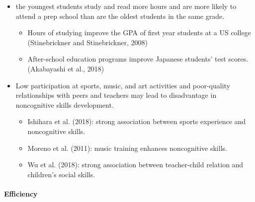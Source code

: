 \documentclass[../root]{subfiles}
\begin{document}
    \begin{itemize}
      \item the youngest students study and read more hours and are more likely to attend a prep school than are the oldest students in the same grade.
      \begin{itemize}
        \item Hours of studying improve the GPA of first year students at a US college (Stinebrickner and Stinebrickner, 2008)
        \item After-school education programs improve Japanese students’ test scores. (Akabayashi et al., 2018)
      \end{itemize}
      \item Low participation at sports, music, and art activities and poor-quality relationships with peers and teachers may lead to disadvantage in noncognitive skills development.
      \begin{itemize}
        \item Ishihara et al. (2018): strong association between sports experience and noncognitive skills.
        \item Moreno et al. (2011): music training enhances noncognitive skills.
        \item Wu et al. (2018): strong association between teacher-child relation and children’s social skills.
      \end{itemize}
    \end{itemize}

    \paragraph{Efficiency}
\end{document}
